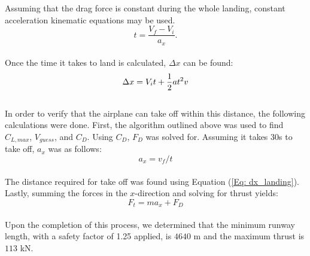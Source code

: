 \documentclass[
	12pt, %
]{fluids_report_style}
\begin{document}
\noindent Assuming that the drag force is constant during the whole landing, constant acceleration kinematic equations may be used. \\

\begin{equation}
    t = \frac{V_f - V_i}{a_x}. 
\end{equation}\\

\noindent Once the time it takes to land is calculated, $\Delta x$ can be found: \\

\begin{equation}
    \Delta x = V_i t + \frac{1}{2} a t^2v \\
    \label{Eq: dx_landing}
\end{equation}\\

\noindent In order to verify that the airplane can take off within this distance, the following calculations were done. First, the algorithm outlined above was used to find $C_{L,max}$, $V_{guess}$, and $C_D$. Using $C_D$, $F_D$ was solved for. Assuming it takes 30s to take off, $a_x$ was as follows:\\

\begin{equation}
    a_x = v_f/t
    \label{Eq: acceleration}
\end{equation}\\

\noindent The distance required for take off was found using Equation (\ref{Eq: dx_landing}). Lastly, summing the forces in the $x$-direction and solving for thrust yields:\\

\begin{equation}
    F_t = m a_x + F_D
    \label{Eq: Thrust}
\end{equation}  \\

Upon the completion of this process, we determined that the minimum runway length, with a safety factor of 1.25 applied, is $4640$ m and the maximum thrust is $113$ kN. 
\end{document}
